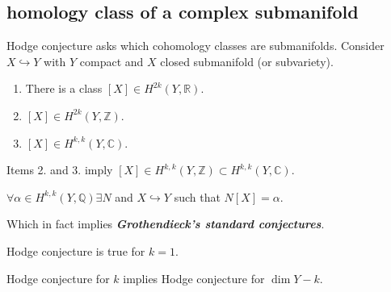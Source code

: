\documentclass{article}
\newcommand{\R}{\mathbb{R}}
\newcommand{\Z}{\mathbb{Z}}
\newcommand{\C}{\mathbb{C}}
\newcommand{\Q}{\mathbb{Q}}
\begin{document}
\subsection{homology class of a complex submanifold}
Hodge conjecture asks which cohomology classes are submanifolds. Consider $X\hookrightarrow Y$ with $Y$ compact and $X$ closed submanifold (or subvariety).
\begin{enumerate}
	\item There is a class $[X]\in H^{2k}(Y,\R)$.
	\item $[X]\in H^{2k}(Y,\Z)$.
	\item $[X]\in H^{k,k}(Y,\C)$.
\end{enumerate}
Items 2. and 3. imply $[X]\in H^{k,k}(Y,\Z)\subset H^{k,k}(Y,\C)$.
\begin{conjecture}[Hodge]
	$\forall\alpha\in H^{k,k}(Y,\Q)\exists N$ and $X\hookrightarrow Y$ such that $N[X]=\alpha$.
\end{conjecture}
Which in fact implies \textbf{\textit{Grothendieck's standard conjectures}}.
\begin{thm}
	Hodge conjecture is true for $k=1$.
\end{thm}
\begin{thm}
	Hodge conjecture for $k$ implies Hodge conjecture for $\dim Y-k$.
\end{thm}
\end{document}
